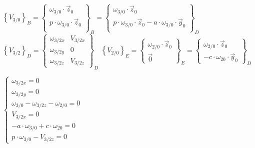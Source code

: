 {$\left\{V_{3/0}\right\}_B=\left\{\begin{array}{c}
 \omega_{3/0}\cdot\vec{z}_0 \\
 p\cdot\omega_{3/0}\cdot\vec{z}_0 \\
 \end{array}\right\}_B=\left\{\begin{array}{c}
 \omega_{3/0}\cdot\vec{z}_0 \\
 p\cdot\omega_{3/0}\cdot\vec{z}_0-a\cdot\omega_{3/0}\cdot\vec{y}_0 \\
 \end{array}\right\}_D$
 $\left\{V_{3/2}\right\}_D=\left\{\begin{array}{cc}
 \omega_{3/2x} & V_{3/2x} \\
 \omega_{3/2y} & 0 \\
 \omega_{3/2z} & V_{3/2z} 
 \end{array}\right\}_D$
 $\left\{V_{2/0}\right\}_E=\left\{\begin{array}{c}
 \omega_{2/0}\cdot\vec{z}_0 \\
 \vec{0} 
 \end{array}\right\}_E=\left\{\begin{array}{c}
 \omega_{2/0}\cdot\vec{z}_0 \\
 -c\cdot\omega_{20}\cdot\vec{y}_0
 \end{array}\right\}_D$

 $\left\{\begin{array}{l}
 \omega_{3/2x}=0\\
 \omega_{3/2y}=0\\
 \omega_{3/0}-\omega_{3/2z}-\omega_{2/0}=0\\
 V_{3/2x}=0\\
 -a\cdot\omega_{3/0}+c\cdot\omega_{20}=0\\
 p\cdot\omega_{3/0}-V_{3/2z}=0
 \end{array}\right.$
}

